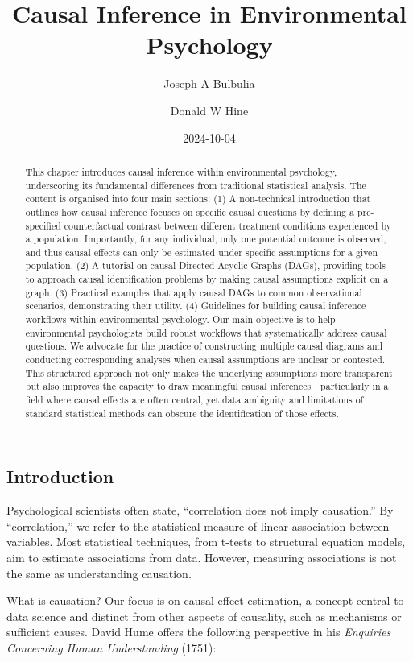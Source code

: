 \documentclass[
  singlecolumn]{article}
\title{Causal Inference in Environmental Psychology}
\author{Joseph A Bulbulia}
\affil{%
             \small{     Victoria University of Wellington, New Zealand,
School of Psychology, Centre for Applied Cross-Cultural Research
          ORCID \textcolor[HTML]{A6CE39}{\aiOrcid} ~0000-0002-5861-2056 }
              }
\author{Donald W Hine}
\affil{%
             \small{     University of Canterbury, School of Psychology,
Speech and Hearing
          ORCID \textcolor[HTML]{A6CE39}{\aiOrcid} ~0000-0002-3905-7026 }
              }
\date{2024-10-04}
\begin{document}
\maketitle
\begin{abstract}
This chapter introduces causal inference within environmental
psychology, underscoring its fundamental differences from traditional
statistical analysis. The content is organised into four main sections:
(1) A non-technical introduction that outlines how causal inference
focuses on specific causal questions by defining a pre-specified
counterfactual contrast between different treatment conditions
experienced by a population. Importantly, for any individual, only one
potential outcome is observed, and thus causal effects can only be
estimated under specific assumptions for a given population. (2) A
tutorial on causal Directed Acyclic Graphs (DAGs), providing tools to
approach causal identification problems by making causal assumptions
explicit on a graph. (3) Practical examples that apply causal DAGs to
common observational scenarios, demonstrating their utility. (4)
Guidelines for building causal inference workflows within environmental
psychology. Our main objective is to help environmental psychologists
build robust workflows that systematically address causal questions. We
advocate for the practice of constructing multiple causal diagrams and
conducting corresponding analyses when causal assumptions are unclear or
contested. This structured approach not only makes the underlying
assumptions more transparent but also improves the capacity to draw
meaningful causal inferences---particularly in a field where causal
effects are often central, yet data ambiguity and limitations of
standard statistical methods can obscure the identification of those
effects.
\end{abstract}

\subsection{Introduction}\label{introduction}

Psychological scientists often state, ``correlation does not imply
causation.'' By ``correlation,'' we refer to the statistical measure of
linear association between variables. Most statistical techniques, from
t-tests to structural equation models, aim to estimate associations from
data. However, measuring associations is not the same as understanding
causation.

What is causation? Our focus is on causal effect estimation, a concept
central to data science and distinct from other aspects of causality,
such as mechanisms or sufficient causes. David Hume offers the following
perspective in his \emph{Enquiries Concerning Human Understanding}
(1751):
\end{document}
